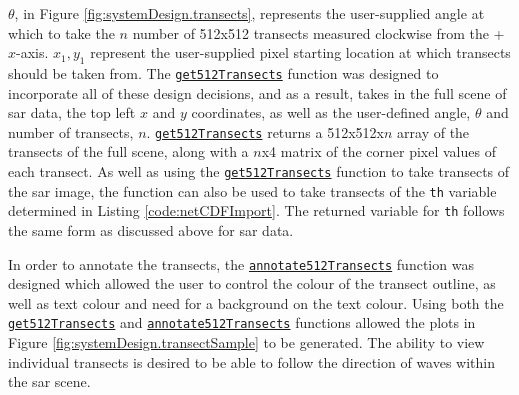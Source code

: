 $\theta$, in Figure \ref{fig:systemDesign.transects}, represents the user-supplied angle at which to take the $n$ number of 512x512 transects measured clockwise from the +$x$-axis. $x_{1},y_{1}$ represent the user-supplied pixel starting location at which transects should be taken from. The \href{https://github.com/JNSRYA006/sar-parameter-extraction-pipeline/blob/main/functions/preprocess/get512Transects.m}{\lstinline{get512Transects}} function was designed to incorporate all of these design decisions, and as a result, takes in the full scene of \acs{sar} data, the top left $x$ and $y$ coordinates, as well as the user-defined angle, $\theta$ and number of transects, $n$. \href{https://github.com/JNSRYA006/sar-parameter-extraction-pipeline/blob/main/functions/preprocess/get512Transects.m}{\lstinline{get512Transects}} returns a 512x512x$n$ array of the transects of the full scene, along with a $n$x4 matrix of the corner pixel values of each transect. As well as using the \href{https://github.com/JNSRYA006/sar-parameter-extraction-pipeline/blob/main/functions/preprocess/get512Transects.m}{\lstinline{get512Transects}} function to take transects of the \acs{sar} image, the function can also be used to take transects of the \lstinline{th} variable determined in Listing \ref{code:netCDFImport}. The returned variable for \lstinline{th} follows the same form as discussed above for \acs{sar} data.

In order to annotate the transects, the \href{https://github.com/JNSRYA006/sar-parameter-extraction-pipeline/blob/main/functions/preprocess/annotate512Transects.m}{\lstinline{annotate512Transects}} function was designed which allowed the user to control the colour of the transect outline, as well as text colour and need for a background on the text colour. Using both the \href{https://github.com/JNSRYA006/sar-parameter-extraction-pipeline/blob/main/functions/preprocess/get512Transects.m}{\lstinline{get512Transects}} and \href{https://github.com/JNSRYA006/sar-parameter-extraction-pipeline/blob/main/functions/preprocess/annotate512Transects.m}{\lstinline{annotate512Transects}} functions allowed the plots in Figure \ref{fig:systemDesign.transectSample} to be generated. The ability to view individual transects is desired to be able to follow the direction of waves within the \acs{sar} scene.

